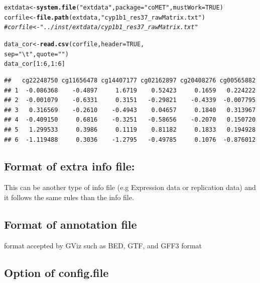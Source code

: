 \documentclass[11pt]{article}\usepackage[]{graphicx}\usepackage[usenames,dvipsnames]{color}
\makeatletter
\newcommand{\hlnum}[1]{\textcolor[rgb]{0.686,0.059,0.569}{#1}}%
\newcommand{\hlstr}[1]{\textcolor[rgb]{0.192,0.494,0.8}{#1}}%
\newcommand{\hlcom}[1]{\textcolor[rgb]{0.678,0.584,0.686}{\textit{#1}}}%
\newcommand{\hlopt}[1]{\textcolor[rgb]{0,0,0}{#1}}%
\newcommand{\hlstd}[1]{\textcolor[rgb]{0.345,0.345,0.345}{#1}}%
\newcommand{\hlkwb}[1]{\textcolor[rgb]{0.69,0.353,0.396}{#1}}%
\newcommand{\hlkwc}[1]{\textcolor[rgb]{0.333,0.667,0.333}{#1}}%
\newcommand{\hlkwd}[1]{\textcolor[rgb]{0.737,0.353,0.396}{\textbf{#1}}}%
\newenvironment{kframe}{%
 \def\at@end@of@kframe{}%
 \ifinner\ifhmode%
  \def\at@end@of@kframe{\end{minipage}}%
  \begin{minipage}{\columnwidth}%
 \fi\fi%
 \def\FrameCommand##1{\hskip\@totalleftmargin \hskip-\fboxsep
 \colorbox{shadecolor}{##1}\hskip-\fboxsep
     \hskip-\linewidth \hskip-\@totalleftmargin \hskip\columnwidth}%
 \MakeFramed {\advance\hsize-\width
   \@totalleftmargin\z@ \linewidth\hsize
   \@setminipage}}%
 {\par\unskip\endMakeFramed%
 \at@end@of@kframe}
\newenvironment{knitrout}{}{} %
\makeatother
\begin{document}
\begin{knitrout}
\color{fgcolor}\begin{kframe}
\begin{alltt}
\hlstd{extdata} \hlkwb{<-} \hlkwd{system.file}\hlstd{(}\hlstr{"extdata"}\hlstd{,} \hlkwc{package}\hlstd{=}\hlstr{"coMET"}\hlstd{,}\hlkwc{mustWork}\hlstd{=}\hlnum{TRUE}\hlstd{)}
\hlstd{corfile} \hlkwb{<-} \hlkwd{file.path}\hlstd{(extdata,} \hlstr{"cyp1b1_res37_rawMatrix.txt"}\hlstd{)}
\hlcom{#corfile <- "../inst/extdata/cyp1b1_res37_rawMatrix.txt" }

\hlstd{data_cor} \hlkwb{<-}\hlkwd{read.csv}\hlstd{(corfile,} \hlkwc{header} \hlstd{=} \hlnum{TRUE}\hlstd{,}
                    \hlkwc{sep} \hlstd{=} \hlstr{"\textbackslash{}t"}\hlstd{,} \hlkwc{quote} \hlstd{=} \hlstr{""}\hlstd{)}
\hlstd{data_cor[}\hlnum{1}\hlopt{:}\hlnum{6}\hlstd{,}\hlnum{1}\hlopt{:}\hlnum{6}\hlstd{]}
\end{alltt}
\begin{verbatim}
##   cg22248750 cg11656478 cg14407177 cg02162897 cg20408276 cg00565882
## 1  -0.086368    -0.4897     1.6719    0.52423     0.1659   0.224222
## 2  -0.001079    -0.6331     0.3151   -0.29821    -0.4339  -0.007795
## 3   0.316569    -0.2610    -0.4943    0.04657     0.1840   0.313967
## 4  -0.409150     0.6816    -0.3251   -0.58656    -0.2070   0.150720
## 5   1.299533     0.3986     0.1119    0.81182     0.1833   0.194928
## 6  -1.119488     0.3036    -1.2795   -0.49785     0.1076  -0.876012
\end{verbatim}
\end{kframe}
\end{knitrout}


\subsection{Format of extra info file:}

This can be another type of info file (e.g Expression data or replication data) and it follows the same rules than the info file.

\subsection{Format of annotation file}

format accepted by GViz such as BED, GTF, and GFF3 format

\subsection{Option of config.file}
\end{document}
